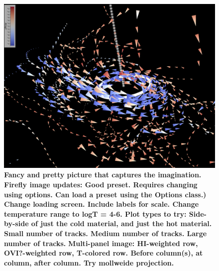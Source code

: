 \documentclass[fleqn,usenatbib]{mnras}
\begin{document}
\begin{figure}
    \centering
    \includegraphics[width=\textwidth]{figures/firefly_m12i_md.png}
    \caption{
    \textbf{Fancy and pretty picture that captures the imagination.}
    \textbf{
    Firefly image updates:
Good preset. Requires changing using options. Can load a preset using the Options class.)
Change loading screen.
Include labels for scale.
Change temperature range to logT = 4-6.
Plot types to try:
Side-by-side of just the cold material, and just the hot material.
Small number of tracks.
Medium number of tracks.
Large number of tracks.
}
    \textbf{
    Multi-panel image:
    HI-weighted row,
    OVI?-weighted row,
    T-colored row.
    Before column(s), at column, after column.
    Try mollweide projection.
    }
    }
    \label{f: overview}
\end{figure}
\end{document}
